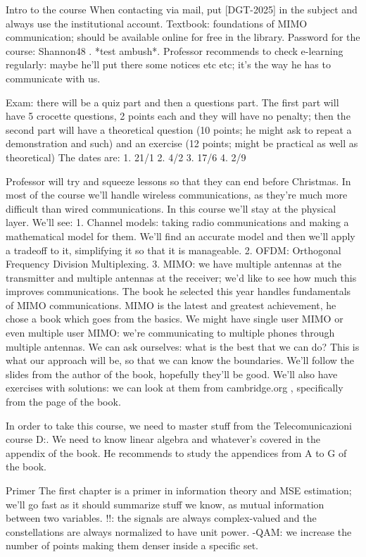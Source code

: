 Intro to the course When contacting via mail, put [DGT-2025] in the subject and always use the institutional account.
Textbook: foundations of MIMO communication; should be available online for free in the library.
Password for the course: Shannon48 .
*test ambush*.
Professor recommends to check e-learning regularly: maybe he'll put there some notices etc etc; it's the way he has to communicate with us.

Exam: there will be a quiz part and then a questions part. The first part will have 5 crocette questions, 2 points each and they will have no penalty; then the second part will have a theoretical question (10 points; he might ask to repeat a demonstration and such) and an exercise (12 points; might be practical as well as theoretical)
The dates are:
1. 21/1 2. 4/2 3. 17/6 4. 2/9

Professor will try and squeeze lessons so that they can end before Christmas.
In most of the course we'll handle wireless communications, as they're much more difficult than wired communications. In this course we'll stay at the physical layer.
We'll see:
1. Channel models: taking radio communications and making a mathematical model for them. We'll find an accurate model and then we'll apply a tradeoff to it, simplifying it so that it is manageable.
2. OFDM: Orthogonal Frequency Division Multiplexing.
3. MIMO: we have multiple antennas at the transmitter and multiple antennas at the receiver; we'd like to see how much this improves communications. The book he selected this year handles fundamentals of MIMO communications. MIMO is the latest and greatest achievement, he chose a book which goes from the basics. We might have single user MIMO or even multiple user MIMO: we're communicating to multiple phones through multiple antennas.
We can ask ourselves: what is the best that we can do? This is what our approach will be, so that we can know the boundaries.
We'll follow the slides from the author of the book, hopefully they'll be good.
We'll also have exercises with solutions: we can look at them from cambridge.org ,
specifically from the page of the book.

In order to take this course, we need to master stuff from the Telecomunicazioni course D:. We need to know linear algebra and whatever's covered in the appendix of the book.
He recommends to study the appendices from A to G of the book.

Primer The first chapter is a primer in information theory and MSE estimation; we'll go fast as it should summarize stuff we know, as mutual information between two variables.
!!: the signals are always complex-valued and the constellations are always normalized to have unit power.
-QAM: we increase the number of points making them denser inside a specific set.

